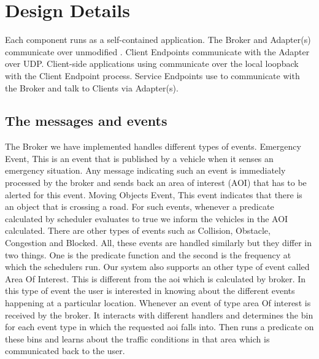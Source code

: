 \section{Design Details}
\label{sec:design-details}

Each \name{} component runs as a self-contained application. The
Broker and Adapter(s) communicate over unmodified \pubsub. Client
Endpoints communicate with the Adapter over UDP. Client-side
applications using \name{} communicate over the local loopback with
the Client Endpoint process. Service Endpoints use \pubsub to
communicate with the Broker and talk to Clients via
Adapter(s).

\subsection{The messages and events}

The \name{} Broker we have implemented handles different types of events. 
Emergency Event, This is an event that is published by a vehicle when it senses
an emergency situation. Any message indicating such an event is immediately 
processed by the \name{} broker and sends back an area of interest (AOI)
that has to be alerted for this event.
Moving Objects Event, This event indicates that there is an object that is 
crossing a road. For such events, whenever a predicate calculated by scheduler 
evaluates to true we inform the vehicles in the AOI calculated.
There are other types of events such as Collision, Obstacle, Congestion and 
Blocked. All, these events are handled similarly but they differ in two things.
One is the predicate function and the second is the frequency at which the 
schedulers run. Our system also supports an other type of event called 
Area Of Interest. This is different from the aoi which is calculated by
\name{} broker. In this type of event the user is interested in knowing about 
the different events happening at a particular location. Whenever an event of 
type area Of interest is received by the \name{} broker. It interacts with 
different handlers and determines the bin for each event type in which the 
requested aoi falls into. Then runs a predicate on these bins and learns about 
the traffic conditions in that area which is communicated back to the user.

